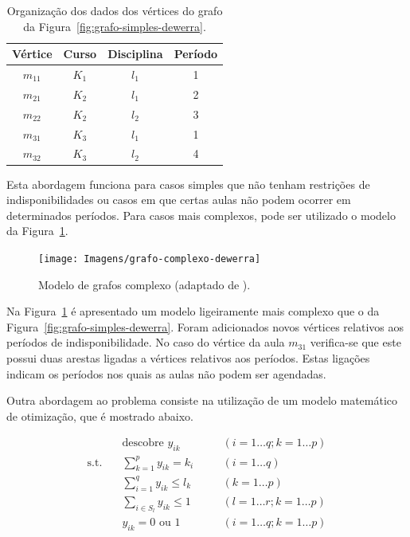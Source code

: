 \begin{table}[H]
    \centering
    \caption{Organização dos dados dos vértices do grafo da Figura~\ref{fig:grafo-simples-dewerra}.}
    \label{tabela:resumo-grafo-simples-dewerra}
    \begin{tabular}{cccc}
        \toprule
        \textbf{Vértice} & \textbf{Curso} & \textbf{Disciplina} & \textbf{Período} \\ \midrule
        $m_{11}$         & $K_{1}$        & $l_{1}$             & 1                \\
        $m_{21}$         & $K_{2}$        & $l_{1}$             & 2                \\
        $m_{22}$         & $K_{2}$        & $l_{2}$             & 3                \\
        $m_{31}$         & $K_{3}$        & $l_{1}$             & 1                \\
        $m_{32}$         & $K_{3}$        & $l_{2}$             & 4                \\
        \bottomrule
    \end{tabular}
\end{table}

Esta abordagem funciona para casos simples que não tenham restrições de indisponibilidades ou casos em que certas aulas não podem ocorrer em determinados períodos. Para casos mais complexos, pode ser utilizado o modelo da Figura~\ref{fig:grafo-complexo-dewerra}.

\begin{figure}[H]
    \centering
    \texttt{[image: Imagens/grafo-complexo-dewerra]}
    \caption{Modelo de grafos complexo (adaptado de \cite{introductiontimetabling-Werra-1985}).}
    \label{fig:grafo-complexo-dewerra}
\end{figure}

Na Figura~\ref{fig:grafo-complexo-dewerra} é apresentado um modelo ligeiramente mais complexo que o da Figura~\ref{fig:grafo-simples-dewerra}. Foram adicionados novos vértices relativos aos períodos de indisponibilidade. No caso do vértice da aula $m_{31}$ verifica-se que este possui duas arestas ligadas a vértices relativos aos períodos. Estas ligações indicam os períodos nos quais as aulas não podem ser agendadas.

Outra abordagem ao problema consiste na utilização de um modelo matemático de otimização, que é mostrado abaixo.

\begin{align}
    & \text{descobre } y_{ik} \quad &&(i = 1 \ldots q; k = 1 \ldots p) \nonumber \\
    \text{s.t.} \quad & \displaystyle\sum_{k=1}^{p} y_{ik} = k_i \quad &&(i = 1 \ldots q) \label{eq-basic:aulas}\\
    & \displaystyle\sum_{i=1}^{q} y_{ik} \leq l_k \quad &&(k = 1 \ldots p) \label{eq-basic:salas}\\
    & \displaystyle\sum_{i \in S_l} y_{ik} \leq 1 \quad &&(l = 1 \ldots r; k = 1 \ldots p) \label{eq-basic:sobreposicao}\\
    & y_{ik} = 0 \text{ ou } 1 \quad &&(i = 1 \ldots q; k = 1 \ldots p) \label{eq-basic:agendamento}
\end{align}

